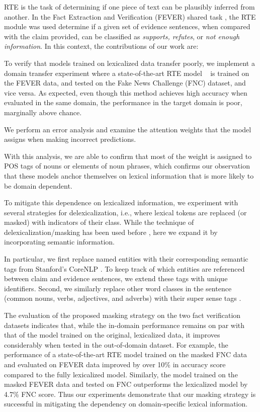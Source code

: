 \documentclass[conference,onecolumn]{IEEEtran}
\begin{document}
RTE is the task of determining if one piece of text can be plausibly inferred from another. In the Fact Extraction and Verification (FEVER) shared task \cite{thorne2018fever}, the RTE module was used determine if a given set of evidence sentences, when compared with the claim provided, can be classified as \textit{supports, refutes}, or \textit{not enough information}.
In this context, the contributions of our work are:

{} To verify that models trained on lexicalized data transfer poorly, we implement a domain transfer experiment where a state-of-the-art RTE model ~\cite{parikh2016decomposable}  is trained on the FEVER data, and tested on the Fake News Challenge (FNC) \cite{pomerleau2017fake} 
dataset, and vice versa. As expected, even though this method achieves high accuracy when evaluated in the same domain, the performance in the target domain is poor, marginally above chance.
 
 
 {} We perform an error analysis and examine the attention weights that the model  assigns when making incorrect predictions.
 
 With this analysis, we are able to confirm that most of the weight is assigned to POS tags of nouns or elements of noun phrases, which confirms our observation that these models anchor themselves on lexical information that is more likely to be domain dependent. 
 
{} To mitigate this dependence on lexicalized information, we experiment with several strategies for delexicalization, i.e., where lexical tokens are replaced (or masked) with indicators of their class. While the technique of delexicalization/masking has been used before \cite[e.g.,]{zeman2008cross}, here we expand it by incorporating semantic information. 



 
In particular, we first replace named entities with their corresponding semantic tags from Stanford's CoreNLP \cite{manning2014stanford}. 
To keep track of which entities are referenced between claim and evidence sentences, we extend these tags with unique identifiers. 
%
Second, we similarly replace other word classes in the sentence (common nouns, verbs, adjectives, and adverbs)  with their super sense tags \cite{ciaramita2003supersense}.



{}  The evaluation of the proposed masking strategy on the two fact verification datasets indicates that,
while the in-domain performance remains on par with that of the model trained on the original, lexicalized data, it improves considerably when tested in the out-of-domain dataset. 
For example, the performance of a state-of-the-art RTE model trained on the masked FNC data and evaluated on FEVER data improved by over 10\% in accuracy score compared to the fully lexicalized model. Similarly, the model trained on the masked FEVER data and tested on FNC outperforms the lexicalized model by 4.7\% FNC score.
Thus our experiments demonstrate that our masking strategy is successful in mitigating the dependency on domain-specific lexical information.
\end{document}
